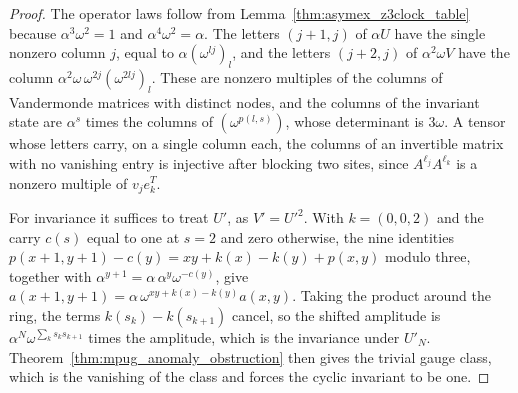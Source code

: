 \begin{proof}
    \leanok
    The operator laws follow from Lemma~\ref{thm:asymex_z3clock_table}
    because $\alpha^3\omega^2=1$ and $\alpha^4\omega^2=\alpha$. The letters
    $(j+1,j)$ of $\alpha U$ have the single nonzero column $j$, equal to
    $\alpha(\omega^{lj})_l$, and the letters $(j+2,j)$ of $\alpha^2\omega V$
    have the column $\alpha^2\omega\,\omega^{2j}(\omega^{2lj})_l$. These are
    nonzero multiples of the columns of Vandermonde matrices with distinct
    nodes, and the columns of the invariant state are $\alpha^s$ times the
    columns of $(\omega^{p(l,s)})$, whose determinant is $3\omega$. A tensor
    whose letters carry, on a single column each, the columns of an
    invertible matrix with no vanishing entry is injective after blocking two
    sites, since $A^{\ell_j}A^{\ell_k}$ is a nonzero multiple of $v_j e_k^{T}$.

    For invariance it suffices to treat $U'$, as $V'=U'^2$. With
    $k=(0,0,2)$ and the carry $c(s)$ equal to one at $s=2$ and zero
    otherwise, the nine identities
    $p(x+1,y+1)-c(y)=xy+k(x)-k(y)+p(x,y)$ modulo three, together with
    $\alpha^{y+1}=\alpha\,\alpha^{y}\omega^{-c(y)}$, give
    $a(x+1,y+1)=\alpha\,\omega^{xy+k(x)-k(y)}a(x,y)$. Taking the product
    around the ring, the terms $k(s_k)-k(s_{k+1})$ cancel, so the shifted
    amplitude is $\alpha^N\omega^{\sum_ks_ks_{k+1}}$ times the amplitude,
    which is the invariance under $U'_N$. Theorem~\ref{thm:mpug_anomaly_obstruction}
    then gives the trivial gauge class, which is the vanishing of the class
    and forces the cyclic invariant to be one.
\end{proof}
